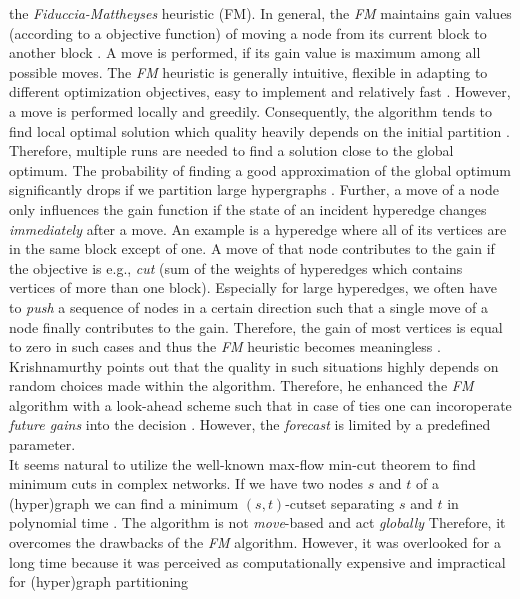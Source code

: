 the \emph{Fiduccia-Mattheyses} heuristic (FM). In general, the \emph{FM}
maintains gain values (according to a objective function) of moving a node
from its current block to another block \cite{fiduccia1988linear}. A move is performed, 
if its gain value is maximum among all possible moves. The \emph{FM} heuristic is generally
intuitive, flexible in adapting to different optimization objectives, easy to implement and
relatively fast \cite{zhao2002effective}. However, a move is performed locally and greedily.
Consequently, the algorithm tends to find local optimal solution which quality heavily depends
on the initial partition \cite{dutt1997vlsi}. Therefore, multiple runs are needed to find
a solution close to the global optimum. The probability of finding a good approximation
of the global optimum significantly drops if we partition large hypergraphs \cite{dutt1997vlsi}. 
Further, a move of a node only influences the gain function if the state of an incident hyperedge
changes \emph{immediately} after a move. An example is a hyperedge where all of its
vertices are in the same block except of one. A move of that node contributes to the gain if
the objective is e.g., \emph{cut} (sum of the weights of hyperedges which contains vertices of more
than one block). Especially for large hyperedges, we often have to \emph{push} a sequence of nodes
in a certain direction such that a single move of a node finally contributes to the gain.
Therefore, the gain of most vertices is equal to zero in such cases and thus the \emph{FM} heuristic
becomes meaningless \cite{mann2014formula}. Krishnamurthy \cite{krishnamurthy1984improved}
points out that the quality in such situations highly depends on random choices made within
the algorithm. Therefore, he enhanced the \emph{FM} algorithm with a look-ahead scheme
such that in case of ties one can incoroperate \emph{future gains} into the decision \cite{krishnamurthy1984improved}.
However, the \emph{forecast} is limited by a predefined parameter. \\
It seems natural to utilize the well-known max-flow min-cut theorem \cite{ford1956maximal}
to find minimum cuts in complex networks. If we have two nodes $s$ and $t$ of a (hyper)graph
we can find a minimum $(s,t)$-cutset separating $s$ and $t$ in polynomial time \cite{edmonds1972theoretical,
ford1956maximal,goldberg1988new}. The algorithm is not \emph{move}-based and act \emph{globally}
Therefore, it overcomes the drawbacks of the \emph{FM} algorithm. However, it was overlooked for a long time because
it was perceived as computationally expensive and impractical for (hyper)graph partitioning
